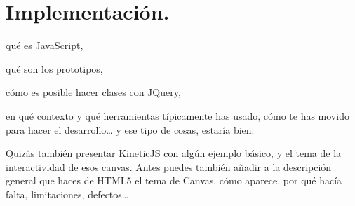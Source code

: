 \newpage\mbox{}\thispagestyle{empty}

\chapter{Implementación.}


qué es JavaScript, 

qué son los prototipos, 

cómo es posible hacer clases con JQuery, 

en qué contexto y qué herramientas típicamente has usado, 
cómo te has movido para hacer el desarrollo… y ese tipo de cosas, estaría bien.  

Quizás también presentar KineticJS con algún ejemplo básico, y el tema de la interactividad de esos canvas.  Antes puedes también añadir a la descripción general que haces de HTML5 el tema de Canvas, cómo aparece, por qué hacía falta, limitaciones, defectos… 